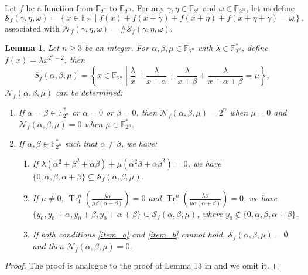 \documentclass{article}
\newcommand{\F}{\mathbb{F}}
\newcommand{\0}{\textbf{0}}
\newcommand{\1}{\textbf{1}}
\newcommand{\TrN}{\operatorname{Tr}_1^n}
\theoremstyle{plain}
\newtheorem{lemma}{Lemma}
\begin{document}
    Let $f$ be a function from $\F_{2^n}$ to $\F_{2^m}$. 
    For any $\gamma,\eta\in\F_{2^n}$ and $\omega\in\F_{2^m}$, let us define
    \[\mathcal{S}_f(\gamma,\eta,\omega)=\left\{x\in\F_{2^n}\middle|f(x)+f(x+\gamma)+f(x+\eta)+f(x+\eta+\gamma)=\omega\right\},\] 
    associated with $\mathcal{N}_f(\gamma,\eta,\omega)=\#\mathcal{S}_f(\gamma,\eta,\omega)$. 

    \begin{lemma}\label{lemma:num_sol_second_dev}
        Let $n\ge 3$ be an integer. 
        For $\alpha,\beta,\mu\in\F_{2^n}$ with $\lambda\in\F_{2^n}^*$, define $f(x)=\lambda x^{2^n-2}$, then 
        \[S_f(\alpha,\beta,\mu)=\left\{ x\in\F_{2^n}\middle|\frac{\lambda}{x}+\frac{\lambda}{x+\alpha}+\frac{\lambda}{x+\beta}+\frac{\lambda}{x+\alpha+\beta}=\mu \right\},\]
        $\mathcal{N}_f(\alpha,\beta,\mu)$ can be determined: 
        \begin{enumerate}[label=(\arabic{*})]
            \item If $\alpha=\beta\in\F_{2^n}^*$ or $\alpha=0$ or $\beta=0$, 
            then $\mathcal{N}_f(\alpha,\beta,\mu)=2^n$ when $\mu = 0$ and $\mathcal{N}_f(\alpha,\beta,\mu)=0$ when $\mu\in\F_{2^n}^*$.
            \item If $\alpha,\beta\in\F_{2^n}^*$ such that $\alpha\ne\beta$, we have: 
            \begin{enumerate}[ref=(\alph{*})]
                \item If $\lambda(\alpha^2+\beta^2+\alpha\beta)+\mu(\alpha^2\beta+\alpha\beta^2)=0$, we have 
                $\{0,\alpha,\beta,\alpha+\beta\}\subseteq\mathcal{S}_f(\alpha,\beta,\mu)$.\label{item_a}
                \item If $\mu\ne 0$, $\TrN\left(\frac{\lambda\alpha}{\mu \beta(\alpha+\beta)}\right)=0$ and 
                $\TrN\left(\frac{\lambda \beta}{\mu \alpha(\alpha+\beta)}\right)=0$, we have 
                $\{y_0,y_0+\alpha,y_0+\beta,y_0+\alpha+\beta\}\subseteq\mathcal{S}_f(\alpha,\beta,\mu)$, where $y_0\notin\{0,\alpha,\beta,\alpha+\beta\}$.\label{item_b}
                \item If both conditions \ref{item_a} and \ref{item_b} cannot hold, $\mathcal{S}_f(\alpha,\beta,\mu)=\emptyset$ and then $\mathcal{N}_f(\alpha,\beta,\mu)=0 $.
            \end{enumerate}
        \end{enumerate}
    \end{lemma}
    \begin{proof}
        The proof is analogue to the proof of Lemma 13 in \cite{tang2022invfunc} and we omit it.
    \end{proof}
\end{document}
